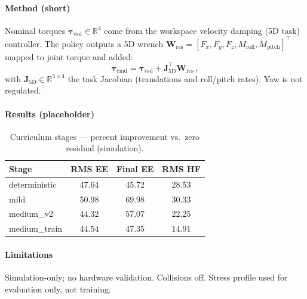 
\paragraph{Method (short)}
Nominal torques $\bm{\tau}_{\mathrm{vsd}}\in\mathbb{R}^4$ come from the workspace velocity damping (5D task) controller.
The policy outputs a 5D wrench $\mathbf{W}_{\mathrm{res}}=[F_x,F_y,F_z,M_{\mathrm{roll}},M_{\mathrm{pitch}}]^\top$ mapped to joint torque and added:
\begin{equation}
  \bm{\tau}_{\mathrm{cmd}} = \bm{\tau}_{\mathrm{vsd}} + \mathbf{J}_{5\mathrm{D}}^\top \mathbf{W}_{\mathrm{res}}\,,
\end{equation}
with $\mathbf{J}_{5\mathrm{D}}\in\mathbb{R}^{5\times 4}$ the task Jacobian (translations and roll/pitch rates). Yaw is not regulated.

\paragraph{Results (placeholder)}
\begin{table}[t]
  \centering
  \caption{Curriculum stages — percent improvement vs.\ zero residual (simulation).}
  \begin{tabular}{lccc}
    \hline
    Stage & RMS EE & Final EE & RMS HF \\
    \hline
    deterministic & 47.64 & 45.72 & 28.53 \\
    mild & 50.98 & 69.98 & 30.33 \\
    medium\_v2 & 44.32 & 57.07 & 22.25 \\
    medium\_train & 44.54 & 47.35 & 14.91 \\
    \hline
  \end{tabular}
\end{table}

\paragraph{Limitations}
Simulation-only; no hardware validation. Collisions off. Stress profile used for evaluation only, not training.
